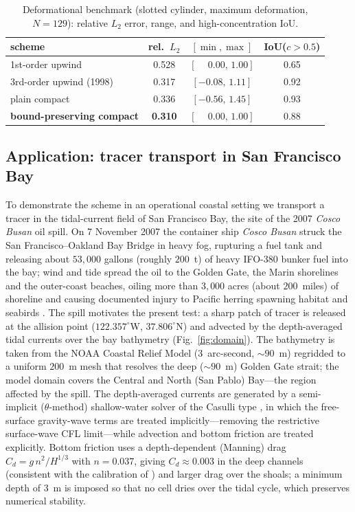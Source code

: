 \documentclass[Journal]{ascelike}   %
\begin{document}
\begin{table}[t]\centering
\caption{Deformational benchmark (slotted cylinder, maximum deformation,
$N=129$): relative $L_2$ error, range, and high-concentration IoU.}
\label{tab:deform}
\begin{tabular}{lccc}
\toprule
scheme & rel.\ $L_2$ & $[\min,\max]$ & IoU($c>0.5$)\\
\midrule
1st-order upwind            & 0.528 & $[\phantom{-}0.00,\,1.00]$ & 0.65\\
3rd-order upwind (1998)      & 0.317 & $[-0.08,\,1.11]$ & 0.92\\
plain compact               & 0.336 & $[-0.56,\,1.45]$ & 0.93\\
\textbf{bound-preserving compact} & \textbf{0.310} & $[\phantom{-}0.00,\,1.00]$ & 0.88\\
\bottomrule
\end{tabular}
\end{table}

\subsection{Application: tracer transport in San Francisco Bay}
\label{sec:sfbay}
To demonstrate the scheme in an operational coastal setting we transport a tracer
in the tidal-current field of San Francisco Bay, the site of the 2007 \emph{Cosco
Busan} oil spill. On 7 November 2007 the container ship \emph{Cosco Busan} struck
the San Francisco--Oakland Bay Bridge in heavy fog, rupturing a fuel tank and
releasing about $53{,}000$ gallons (roughly $200$~t) of heavy IFO-380 bunker fuel
into the bay; wind and tide spread the oil to the Golden Gate, the Marin shorelines
and the outer-coast beaches, oiling more than $3{,}000$ acres (about $200$~miles) of
shoreline and causing documented injury to Pacific herring spawning habitat and
seabirds \citep{noaacoscobusan,incardona2012pnas,incardona2012plos}. The spill
motivates the present test: a sharp patch of tracer is released at the allision
point ($122.357^\circ$W, $37.806^\circ$N) and advected by the depth-averaged tidal
currents over the bay bathymetry (Fig.~\ref{fig:domain}). The bathymetry is taken
from the NOAA Coastal Relief Model ($3$~arc-second, $\sim\!90$~m) regridded to a
uniform $200$~m mesh that resolves the deep ($\sim\!90$~m) Golden Gate strait; the
model domain covers the Central and North (San Pablo) Bay---the region affected by
the spill. The depth-averaged currents are generated by a semi-implicit
($\theta$-method) shallow-water solver of the Casulli type
\citep{casulli1990,casulli1992}, in which the free-surface gravity-wave terms are
treated implicitly---removing the restrictive surface-wave CFL limit---while
advection and bottom friction are treated explicitly. Bottom friction uses a
depth-dependent (Manning) drag $C_d=g\,n^2/H^{1/3}$ with $n=0.037$, giving
$C_d\approx0.003$ in the deep channels (consistent with the calibration of
\citealp{sankaranarayanan2003}) and larger drag over the shoals; a minimum depth of
$3$~m is imposed so that no cell dries over the tidal cycle, which preserves
numerical stability.
\end{document}
